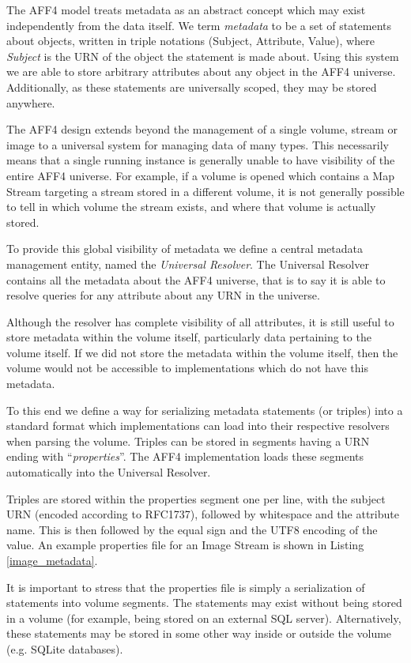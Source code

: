 \documentclass[10pt, conference]{IEEEtran}
\begin{document}
The AFF4 model treats metadata as an abstract concept which may exist
independently from the data itself. We term {\em metadata} to be a set
of statements about objects, written in triple notations (Subject,
Attribute, Value), where {\em Subject} is the URN of the object the
statement is made about. Using this system we are able to store
arbitrary attributes about any object in the AFF4
universe. Additionally, as these statements are universally scoped,
they may be stored anywhere.

The AFF4 design extends beyond the management of a single volume,
stream or image to a universal system for managing data of many
types. This necessarily means that a single running instance is
generally unable to have visibility of the entire AFF4 universe. For
example, if a volume is opened which contains a Map Stream targeting a
stream stored in a different volume, it is not generally possible to
tell in which volume the stream exists, and where that volume is
actually stored.

To provide this global visibility of metadata we define a central
metadata management entity, named the {\em Universal Resolver}. The
Universal Resolver contains all the metadata about the AFF4 universe,
that is to say it is able to resolve queries for any attribute about
any URN in the universe.

Although the resolver has complete visibility of all attributes, it is
still useful to store metadata within the volume itself, particularly
data pertaining to the volume itself. If we did not store the metadata
within the volume itself, then the volume would not be accessible to
implementations which do not have this metadata.

To this end we define a way for serializing metadata statements (or
triples) into a standard format which implementations can load into
their respective resolvers when parsing the volume. Triples can be
stored in segments having a URN ending with ``{\em properties}''. The
AFF4 implementation loads these segments automatically into the
Universal Resolver.

Triples are stored within the properties segment one per line, with
the subject URN (encoded according to RFC1737), followed by whitespace
and the attribute name. This is then followed by the equal sign and
the UTF8 encoding of the value. An example properties file for an
Image Stream is shown in Listing \ref{image_metadata}.

It is important to stress that the properties file is simply a
serialization of statements into volume segments. The statements may
exist without being stored in a volume (for example, being stored on
an external SQL server). Alternatively, these statements may be stored
in some other way inside or outside the volume (e.g. SQLite
databases).
\end{document}
